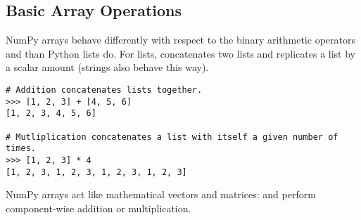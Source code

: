 \subsection*{Basic Array Operations} %

NumPy arrays behave differently with respect to the binary arithmetic operators \li{+} and \li{*} than Python lists do.
For lists, \li{+} concatenates two lists and \li{*} replicates a list by a scalar amount (strings also behave this way).

\begin{lstlisting}
# Addition concatenates lists together.
>>> [1, 2, 3] + [4, 5, 6]
[1, 2, 3, 4, 5, 6]

# Mutliplication concatenates a list with itself a given number of times.
>>> [1, 2, 3] * 4
[1, 2, 3, 1, 2, 3, 1, 2, 3, 1, 2, 3]
\end{lstlisting}

NumPy arrays act like mathematical vectors and matrices: \li{+} and \li{*} perform component-wise addition or multiplication.
\begin{comment}
\[
\left[\begin{array}{c}1 \\ 2 \\ 3\end{array}\right]
+
\left[\begin{array}{c}4 \\ 5 \\ 6\end{array}\right]
=
\left[\begin{array}{c}1+4 \\ 2+5 \\ 3+6\end{array}\right]
=
\left[\begin{array}{c}5 \\ 7 \\ 9\end{array}\right]
\qquad
4*
\left[\begin{array}{c}1 \\ 2 \\ 3\end{array}\right]
=
\left[\begin{array}{c}4*1 \\ 4*2 \\ 4*3\end{array}\right]
=
\left[\begin{array}{c}4 \\ 8 \\ 12\end{array}\right]
\]
\end{comment}

